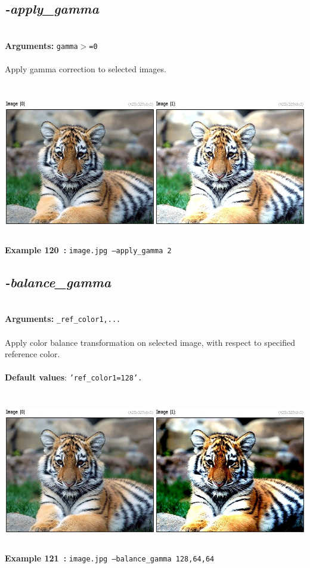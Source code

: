 \documentclass[a4paper,11pt,twoside]{book}
\begin{document}
\subsection{\emph{-apply\_gamma} }\vspace*{-0.5em}
~\\\textbf{Arguments: } 
{\small \texttt{gamma$>$=0}}\\~\\
Apply gamma correction to selected images.
\begin{center}\includegraphics[keepaspectratio=true,height=7cm,width=\textwidth]{img/gmic_def120.jpg}\\
{\footnotesize \textbf{Example 120~:} \texttt{image.jpg --apply\_gamma 2}}
\end{center}

\subsection{\emph{-balance\_gamma} }\vspace*{-0.5em}
~\\\textbf{Arguments: } 
{\small \texttt{\_ref\_color1,...}}\\~\\
Apply color balance transformation on selected image, with respect to specified reference color.
~\\~\\\textbf{Default values}: {\small \texttt{'ref\_color1=128'.}}
\begin{center}\includegraphics[keepaspectratio=true,height=7cm,width=\textwidth]{img/gmic_def121.jpg}\\
{\footnotesize \textbf{Example 121~:} \texttt{image.jpg --balance\_gamma 128,64,64}}
\end{center}
\end{document}
